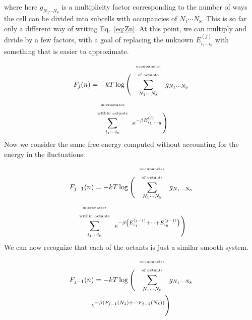 \documentclass[letterpaper,twocolumn,amsmath,amssymb,pre,aps,10pt]{revtex4-1}
\begin{document}
where here $g_{N_1\cdots N_8}$ is a multiplicity factor
corresponding to the number of ways the cell can be divided into
subcells with occupancies of $N_1\cdots N_8$.  This is so far only a
different way of writing Eq.~\ref{eq:Zn}.  At this point, we can
multiply and divide by a few factors, with a goal of replacing the
unknown $E_{i_1\cdots i_8}^{(j)}$ with something that is easier to
approximate.
\begin{multline}
  F_j(n) = -kT\log\Bigg(
    \sum_{N_1\cdots N_8}^{\scriptscriptstyle\begin{array}{c}
                  \text{\tiny occupancies}\\
                  \text{\tiny of octants}\\
                 \end{array}}
       g_{N_1\cdots N_8}
       \\
       \sum_{i_1\cdots i_8}^{\scriptscriptstyle\begin{array}{c}
                  \text{\tiny microstates}\\
                  \text{\tiny within octants}\\
                 \end{array}}
       e^{-\beta E_{i_1\cdots i_8}^{(j)}}
  \Bigg)
\end{multline}
Now we consider the same free energy computed without accounting for
the energy in the fluctuations:
\begin{multline}
  F_{j-1}(n) = -kT\log\Bigg(
    \sum_{N_1\cdots N_8}^{\scriptscriptstyle\begin{array}{c}
                  \text{\tiny occupancies}\\
                  \text{\tiny of octants}\\
                 \end{array}}
       g_{N_1\cdots N_8}
       \\
       \sum_{i_1\cdots i_8}^{\scriptscriptstyle\begin{array}{c}
                  \text{\tiny microstates}\\
                  \text{\tiny within octants}\\
                 \end{array}}
       e^{-\beta \left(E_{i_1}^{(j-1)} + \cdots + E_{i_8}^{(j-1)}\right)}
  \Bigg)
\end{multline}
We can now recognize that each of the octants is just a similar smooth
system.
\begin{multline}
  F_{j-1}(n) = -kT\log\Bigg(
    \sum_{N_1\cdots N_8}^{\scriptscriptstyle\begin{array}{c}
                  \text{\tiny occupancies}\\
                  \text{\tiny of octants}\\
                 \end{array}}
       g_{N_1\cdots N_8}
       \\
       e^{-\beta \left( F_{j-1}(N_1) + \cdots F_{j-1}(N_8) \right)}
  \Bigg)
\end{multline}
\end{document}
